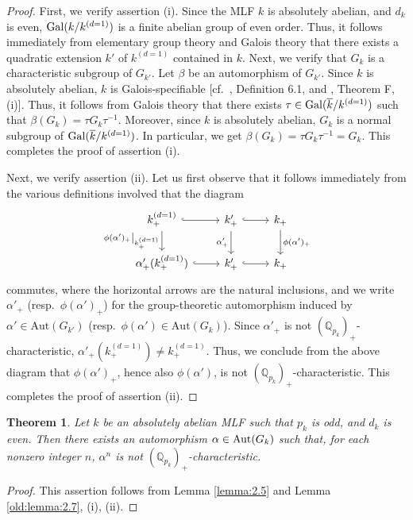 \documentclass[12pt,showkeys]{amsart}
\theoremstyle{theorem}
\newtheorem{theorem}{Theorem}[section]
\theoremstyle{definition}
\def\bQ{{\mathbb Q}}
\def\Aut{{\mbox{Aut}}}
\begin{document}
\begin{proof}
First, we verify assertion (i). Since the MLF $k$ is absolutely abelian, and $d_k$ is even, ${\rm Gal}(k/k^{(d=1)})$ is a finite abelian group of even order. Thus, it follows immediately from elementary group theory and Galois theory that there exists a quadratic extension $k'$ of $k^{(d=1)}$ contained in $k$. Next, we verify that $G_k$ is a characteristic subgroup of $G_{k'}$. Let $\beta$ be an automorphism of $G_{k'}$. Since $k$ is absolutely abelian, $k$ is Galois-specifiable [cf.\ \cite{Hoshi2}, Definition 6.1, and \cite{Hoshi2}, Theorem F, (i)]. Thus, it follows from Galois theory that there exists $\tau \in {\rm Gal}(\overline{k}/k^{(d=1)})$ such that $\beta(G_k)=\tau G_k \tau^{-1}$. Moreover, since $k$ is absolutely abelian, $G_k$ is a normal subgroup of ${\rm Gal}(\overline{k}/k^{(d=1)})$. In particular, we get $\beta(G_k) = \tau G_k \tau^{-1} = G_k$. This completes the proof of assertion (i).

Next, we verify assertion (ii). Let us first observe that it follows immediately from the various definitions involved that the diagram 
\[
\begin{tikzcd}
k^{(d=1)}_+ \arrow[r, hook] \arrow[d, "\left. \phi(\alpha')_+ \right|_{k^{(d=1)}_+}"'] & k'_+ \arrow[r, hook] \arrow[d, "\alpha'_+"'] & k_+ \arrow[d, "\phi(\alpha')_+"] \\
\alpha'_+(k^{(d=1)}_+) \arrow[r, hook]                                                 & k'_+ \arrow[r, hook]                         & k_+                             
\end{tikzcd}
\]
commutes, where the horizontal arrows are the natural inclusions, and we write $\alpha'_+$ (resp.\ $\phi(\alpha')_+$) for the group-theoretic automorphism induced by $\alpha' \in \Aut(G_{k'})$ (resp.\ $\phi(\alpha') \in \Aut(G_k)$). 
Since $\alpha'_+$ is not $(\bQ_{p_k})_+$-characteristic, $\alpha'_+(k_+^{(d=1)}) \neq k_+^{(d=1)}$. 
Thus, we conclude from the above diagram that $\phi(\alpha')_+$, hence also $\phi(\alpha')$, is not $(\bQ_{p_k})_+$-characteristic. This completes the proof of assertion (ii). 
\end{proof}

\begin{theorem}\label{one:theorem:2.8}
Let $k$ be an absolutely abelian MLF such that $p_k$ is odd, and $d_k$ is even. Then there exists an automorphism $\alpha \in {\rm Aut}(G_k)$ such that, for each nonzero integer $n$, $\alpha^n$ is not $(\bQ_{p_k})_+$-characteristic. 
\end{theorem}
\begin{proof}
This assertion follows from Lemma \ref{lemma:2.5} and Lemma \ref{old:lemma:2.7}, (i), (ii). 
\end{proof}
\end{document}
